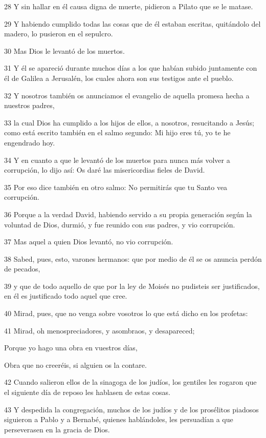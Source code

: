 \par 28 Y sin hallar en él causa digna de muerte, pidieron a Pilato que se le matase.
\par 29 Y habiendo cumplido todas las cosas que de él estaban escritas, quitándolo del madero, lo pusieron en el sepulcro.
\par 30 Mas Dios le levantó de los muertos.
\par 31 Y él se apareció durante muchos días a los que habían subido juntamente con él de Galilea a Jerusalén, los cuales ahora son sus testigos ante el pueblo.
\par 32 Y nosotros también os anunciamos el evangelio de aquella promesa hecha a nuestros padres,
\par 33 la cual Dios ha cumplido a los hijos de ellos, a nosotros, resucitando a Jesús; como está escrito también en el salmo segundo: Mi hijo eres tú, yo te he engendrado hoy.
\par 34 Y en cuanto a que le levantó de los muertos para nunca más volver a corrupción, lo dijo así: Os daré las misericordias fieles de David.
\par 35 Por eso dice también en otro salmo: No permitirás que tu Santo vea corrupción.
\par 36 Porque a la verdad David, habiendo servido a su propia generación según la voluntad de Dios, durmió, y fue reunido con sus padres, y vio corrupción.
\par 37 Mas aquel a quien Dios levantó, no vio corrupción.
\par 38 Sabed, pues, esto, varones hermanos: que por medio de él se os anuncia perdón de pecados,
\par 39 y que de todo aquello de que por la ley de Moisés no pudisteis ser justificados, en él es justificado todo aquel que cree.
\par 40 Mirad, pues, que no venga sobre vosotros lo que está dicho en los profetas:
\par 41 Mirad, oh menospreciadores, y asombraos, y desapareced;
\par Porque yo hago una obra en vuestros días,
\par Obra que no creeréis, si alguien os la contare.
\par 42 Cuando salieron ellos de la sinagoga de los judíos, los gentiles les rogaron que el siguiente día de reposo les hablasen de estas cosas.
\par 43 Y despedida la congregación, muchos de los judíos y de los prosélitos piadosos siguieron a Pablo y a Bernabé, quienes hablándoles, les persuadían a que perseverasen en la gracia de Dios.
